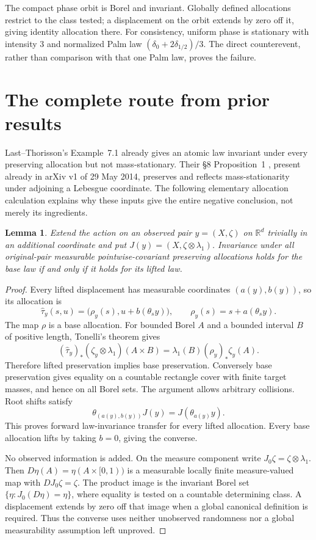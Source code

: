 \documentclass[11pt]{article}
\newtheorem{lemma}{Lemma}
\newcommand{\R}{\mathbb R}
\begin{document}
The compact phase orbit is Borel and invariant. Globally defined allocations restrict to the class tested; a displacement on the orbit extends by zero off it, giving identity allocation there. For consistency, uniform phase is stationary with intensity $3$ and normalized Palm law $(\delta_0+2\delta_{1/2})/3$. The direct counterevent, rather than comparison with that one Palm law, proves the failure.

\section{The complete route from prior results}\label{prior}

Last--Thorisson's Example~7.1 \cite{LT09} already gives an atomic law invariant under every preserving allocation but not mass-stationary. Their \S8 Proposition~1 \cite{LT15}, present already in arXiv v1 of 29 May 2014, preserves and reflects mass-stationarity under adjoining a Lebesgue coordinate. The following elementary allocation calculation explains why these inputs give the entire negative conclusion, not merely its ingredients.

\begin{lemma}
Extend the action on an observed pair $y=(X,\zeta)$ on $\R^d$ trivially in an additional coordinate and put $J(y)=(X,\zeta\otimes\lambda_1)$. Invariance under all original-pair measurable pointwise-covariant preserving allocations holds for the base law if and only if it holds for its lifted law.
\end{lemma}

\begin{proof}
Every lifted displacement has measurable coordinates $(a(y),b(y))$, so its allocation is
\[
 \widehat\tau_y(s,u)
 =\bigl(\rho_y(s),u+b(\theta_sy)\bigr),
 \qquad \rho_y(s)=s+a(\theta_sy).
\]
The map $\rho$ is a base allocation. For bounded Borel $A$ and a bounded interval $B$ of positive length, Tonelli's theorem gives
\begin{equation}\label{transfer}
 (\widehat\tau_y)_*(\zeta_y\otimes\lambda_1)(A\times B)
 =\lambda_1(B)(\rho_y)_*\zeta_y(A).
\end{equation}
Therefore lifted preservation implies base preservation. Conversely base preservation gives equality on a countable rectangle cover with finite target masses, and hence on all Borel sets. The argument allows arbitrary collisions. Root shifts satisfy
\[
 \theta_{(a(y),b(y))}J(y)=J(\theta_{a(y)}y).
\]
This proves forward law-invariance transfer for every lifted allocation. Every base allocation lifts by taking $b=0$, giving the converse.

No observed information is added. On the measure component write $J_0\zeta=\zeta\otimes\lambda_1$. Then $D\eta(A)=\eta(A\times[0,1))$ is a measurable locally finite measure-valued map with $DJ_0\zeta=\zeta$. The product image is the invariant Borel set $\{\eta:J_0(D\eta)=\eta\}$, where equality is tested on a countable determining class. A displacement extends by zero off that image when a global canonical definition is required. Thus the converse uses neither unobserved randomness nor a global measurability assumption left unproved.
\end{proof}
\end{document}
